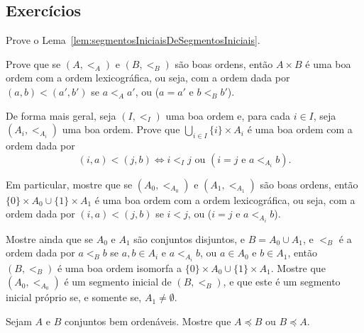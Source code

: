 
\subsection*{Exercícios}
\begin{exercise}
    Prove o Lema~\ref{lem:segmentosIniciaisDeSegmentosIniciais}.
\end{exercise}
\begin{exercise}[$\BST$]
    Prove que se $(A, <_A)$ e $(B, <_B)$ são boas ordens, então $A\times B$ é uma boa ordem com a ordem lexicográfica, ou seja, com a ordem dada por $(a, b)<(a', b')$ se $a<_A a'$, ou ($a=a'$ e $b<_B b'$).
\end{exercise}
\begin{exercise}[$Z^-$]
    De forma mais geral, seja $(I, <_I)$ uma boa ordem e, para cada $i\in I$, seja $(A_i, <_{A_i})$ uma boa ordem.
    Prove que $\bigcup_{i\in I} \{i\}\times A_i$ é uma boa ordem com a ordem dada por
    \[
    (i,a)<(j,b)\iff i<_I j \text{ ou } (i=j \text{ e } a<_{A_i} b).
    \]
\end{exercise}
\begin{exercise}[$\BST$]\label{exr:uniaoDeBoasOrdens}
Em particular, mostre que se $(A_0, <_{A_0})$ e $(A_1, <_{A_1})$ são boas ordens, então $\{0\}\times A_0\cup \{1\}\times A_1$ é uma boa ordem com a ordem lexicográfica, ou seja, com a ordem dada por $(i, a)<(j, b)$ se $i<j$, ou ($i=j$ e $a<_{A_i} b$).

Mostre ainda que se $A_0$ e $A_1$ são conjuntos disjuntos, e $B=A_0\cup A_1$, e $<_B$ é a ordem dada por $a<_B b$ se $a, b\in A_i$ e $a<_{A_i} b$, ou $a\in A_0$ e $b\in A_1$, então $(B, <_B)$ é uma boa ordem isomorfa a $\{0\}\times A_0\cup \{1\}\times A_1$.
Mostre que $(A_0, <_{A_0})$ é um segmento inicial de $(B, <_B)$, e que este é um segmento inicial próprio se, e somente se, $A_1\neq \emptyset$.
\end{exercise}

\begin{exercise}[$\BST$]
    Sejam $A$ e $B$ conjuntos bem ordenáveis.
    Mostre que $A\preceq B$ ou $B\preceq A$.
\end{exercise}
